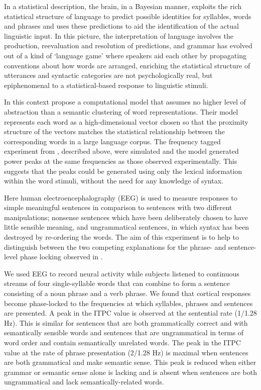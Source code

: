 \documentclass[a4paper,10pt,twoside]{article}
\begin{document}
In a statistical description, the brain, in a Bayesian manner,
exploits the rich statistical structure of language to predict
possible identities for syllables, words and phrases and uses these
predictions to aid the identification of the actual linguistic
input. In this picture, the interpretation of language involves the
production, reevaluation and resolution of predictions, and grammar
has evolved out of a kind of \lq{}language game\rq{} where speakers
aid each other by propagating conventions about how words are
arranged, enriching the statistical structure of utterances and
syntactic categories are not psychologically real, but epiphenomenal
to a statistical-based response to linguistic stimuli.

In this context \cite{FrankYang2018} propose a computational model
that assumes no higher level of abstraction than a semantic clustering
of word representations. Their model represents each word as a
high-dimensional vector chosen so that the proximity structure of the
vectors matches the statistical relationship between the corresponding
words in a large language corpus. The frequency tagged experiment from
\cite{DingEtAl2016}, described above, were simulated and the model
generated power peaks at the same frequencies as those observed
experimentally. This suggests that the peaks could be generated using
only the lexical information within the word stimuli, without the need
for any knowledge of syntax.

Here human electroencephalography (EEG) is used to measure responses
to simple meaningful sentences in comparison to sentences with two
different manipulations; nonsense sentences which have been
deliberately chosen to have little sensible meaning, and ungrammatical
sentences, in which syntax has been destroyed by re-ordering the
words. The aim of this experiment is to help to distinguish between
the two competing explanations for the phrase- and sentence-level
phase locking observed in \cite{DingEtAl2016,DingEtAl2017}.

We used EEG to record neural activity while subjects listened to
continuous streams of four single-syllable words that can combine to
form a sentence consisting of a noun phrase and a verb phrase. We
found that cortical responses become phase-locked to the frequencies
at which syllables, phrases and sentences are presented. A peak in the
ITPC value is observed at the sentential rate (1/1.28 Hz). This is
similar for sentences that are both grammatically correct and with
semantically sensible words and sentences that are ungrammatical in
terms of word order and contain semantically unrelated words. The peak
in the ITPC value at the rate of phrase presentation (2/1.28 Hz) is
maximal when sentences are both grammatical and make semantic
sense. This peak is reduced when either grammar or semantic sense
alone is lacking and is absent when sentences are both ungrammatical
and lack semantically-related words.
\end{document}
